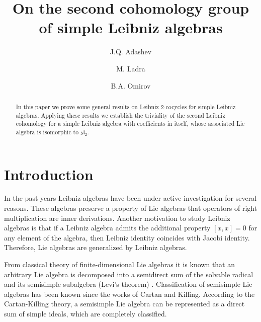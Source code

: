 \documentclass[12pt,reqno]{amsart}
\numberwithin{equation}{section}
\begin{document}
\title{On the second cohomology group of simple Leibniz algebras}
\author{J.Q. Adashev}
\address{[J.Q. Adashev] Institute of Mathematics, National University of Uzbekistan, Tashkent, 100125, Uzbekistan.}
\author{M. Ladra}
\address{[M. Ladra] Department of Algebra, University of Santiago de Compostela, 15782, Spain.}
\author{B.A. Omirov}
\address{[B.A. Omirov] Institute of Mathematics, National University of Uzbekistan, Tashkent, 100125, Uzbekistan.}

\begin{abstract}
In this paper we prove some general results on Leibniz 2-cocycles for simple Leibniz algebras.
 Applying these results we establish the triviality of the second Leibniz cohomology for a simple Leibniz algebra with coefficients in itself,
  whose associated Lie algebra is isomorphic to $\mathfrak{sl}_2$.
\end{abstract}

\maketitle

\section{Introduction}

In the past years Leibniz algebras have been under active investigation for several reasons. These algebras preserve a property of Lie algebras
 that operators of right multiplication are inner derivations. Another motivation to study Leibniz algebras is that if a Leibniz algebra admits
  the additional property $[x, x]=0$ for any element of the algebra, then Leibniz identity coincides with Jacobi identity. Therefore, Lie algebras are generalized by Leibniz algebras.

From classical theory of finite-dimensional Lie algebras it is known that an arbitrary Lie algebra is decomposed into a semidirect sum
 of the solvable radical and its semisimple subalgebra (Levi's theorem) \cite{Jac}. Classification of semisimple Lie algebras has been known
  since the works of Cartan and Killing. According to the Cartan-Killing theory, a semisimple Lie algebra can be represented as a direct sum
   of simple ideals, which are completely classified.
\end{document}
